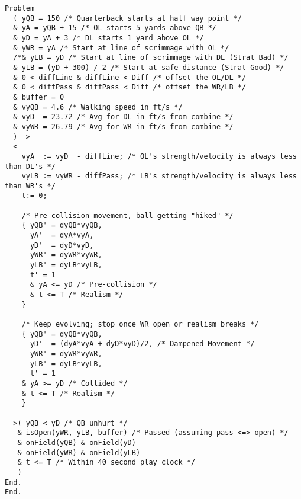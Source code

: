 \begin{lstlisting}
Problem
  ( yQB = 150 /* Quarterback starts at half way point */
  & yA = yQB + 15 /* OL starts 5 yards above QB */
  & yD = yA + 3 /* DL starts 1 yard above OL */
  & yWR = yA /* Start at line of scrimmage with OL */
  /*& yLB = yD /* Start at line of scrimmage with DL (Strat Bad) */
  & yLB = (yD + 300) / 2 /* Start at safe distance (Strat Good) */
  & 0 < diffLine & diffLine < Diff /* offset the OL/DL */
  & 0 < diffPass & diffPass < Diff /* offset the WR/LB */
  & buffer = 0
  & vyQB = 4.6 /* Walking speed in ft/s */
  & vyD  = 23.72 /* Avg for DL in ft/s from combine */
  & vyWR = 26.79 /* Avg for WR in ft/s from combine */
  ) ->
  <
    vyA  := vyD  - diffLine; /* OL's strength/velocity is always less than DL's */
    vyLB := vyWR - diffPass; /* LB's strength/velocity is always less than WR's */
    t:= 0;

    /* Pre-collision movement, ball getting "hiked" */
    { yQB' = dyQB*vyQB,
      yA'  = dyA*vyA,
      yD'  = dyD*vyD,
      yWR' = dyWR*vyWR,
      yLB' = dyLB*vyLB,
      t' = 1
      & yA <= yD /* Pre-collision */
      & t <= T /* Realism */
    }

    /* Keep evolving; stop once WR open or realism breaks */
    { yQB' = dyQB*vyQB,
      yD'  = (dyA*vyA + dyD*vyD)/2, /* Dampened Movement */
      yWR' = dyWR*vyWR,
      yLB' = dyLB*vyLB,
      t' = 1
    & yA >= yD /* Collided */
    & t <= T /* Realism */
    }

  >( yQB < yD /* QB unhurt */
   & isOpen(yWR, yLB, buffer) /* Passed (assuming pass <=> open) */
   & onField(yQB) & onField(yD)
   & onField(yWR) & onField(yLB)
   & t <= T /* Within 40 second play clock */
   )
End.
End.
\end{lstlisting}

